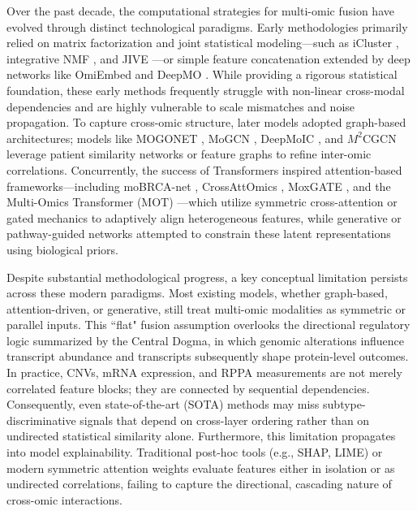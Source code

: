 \documentclass[lettersize,journal]{IEEEtran}
\begin{document}
Over the past decade, the computational strategies for multi-omic fusion have evolved through distinct technological paradigms. Early methodologies primarily relied on matrix factorization and joint statistical modeling—such as iCluster \cite{iCluster2009}, integrative NMF \cite{IntNMF2017}, and JIVE \cite{JIVE2013}—or simple feature concatenation extended by deep networks like OmiEmbed \cite{OmiEmbed2021} and DeepMO \cite{DeepMO2020}. While providing a rigorous statistical foundation, these early methods frequently struggle with non-linear cross-modal dependencies and are highly vulnerable to scale mismatches and noise propagation. To capture cross-omic structure, later models adopted graph-based architectures; models like MOGONET \cite{MOGONET2021}, MoGCN \cite{MoGCN2022}, DeepMoIC \cite{DeepMoIC2024}, and $M^2$CGCN \cite{M2CGCN2025} leverage patient similarity networks or feature graphs to refine inter-omic correlations. Concurrently, the success of Transformers inspired attention-based frameworks—including moBRCA-net \cite{moBRCAnat2023}, CrossAttOmics \cite{CrossAttOmics2024}, MoxGATE \cite{MoxGATE2023}, and the Multi-Omics Transformer (MOT) \cite{MOT2023}—which utilize symmetric cross-attention or gated mechanics to adaptively align heterogeneous features, while generative or pathway-guided networks \cite{SubtypeGAN2020, SurvPath2023} attempted to constrain these latent representations using biological priors.

Despite substantial methodological progress, a key conceptual limitation persists across these modern paradigms. Most existing models, whether graph-based, attention-driven, or generative, still treat multi-omic modalities as symmetric or parallel inputs. This ``flat" fusion assumption overlooks the directional regulatory logic summarized by the Central Dogma, in which genomic alterations influence transcript abundance and transcripts subsequently shape protein-level outcomes. In practice, CNVs, mRNA expression, and RPPA measurements are not merely correlated feature blocks; they are connected by sequential dependencies. Consequently, even state-of-the-art (SOTA) methods may miss subtype-discriminative signals that depend on cross-layer ordering rather than on undirected statistical similarity alone. Furthermore, this limitation propagates into model explainability. Traditional post-hoc tools (e.g., SHAP, LIME) or modern symmetric attention weights \cite{moBRCAnat2023, OmiEmbed2021} evaluate features either in isolation or as undirected correlations, failing to capture the directional, cascading nature of cross-omic interactions.
\end{document}
